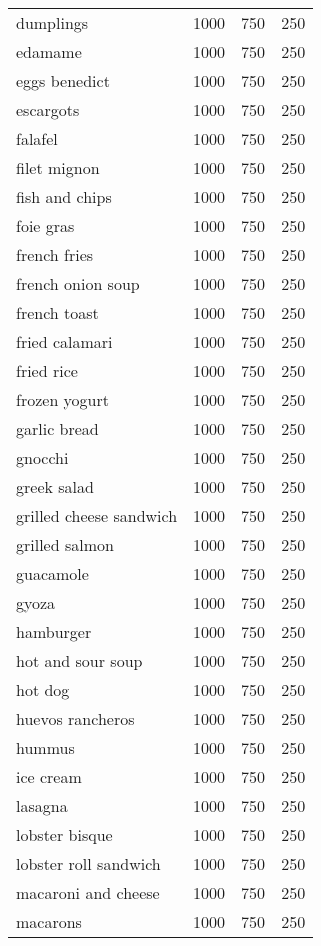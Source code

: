 \begin{center}
\begin{longtable}{|l|l|l|l|}
        dumplings & 1000 & 750 & 250 \\
        edamame & 1000 & 750 & 250 \\
        eggs benedict & 1000 & 750 & 250 \\
        escargots & 1000 & 750 & 250 \\
        falafel & 1000 & 750 & 250 \\
        filet mignon & 1000 & 750 & 250 \\
        fish and chips & 1000 & 750 & 250 \\
        foie gras & 1000 & 750 & 250 \\
        french fries & 1000 & 750 & 250 \\
        french onion soup & 1000 & 750 & 250 \\
        french toast & 1000 & 750 & 250 \\
        fried calamari & 1000 & 750 & 250 \\
        fried rice & 1000 & 750 & 250 \\
        frozen yogurt & 1000 & 750 & 250 \\
        garlic bread & 1000 & 750 & 250 \\
        gnocchi & 1000 & 750 & 250 \\
        greek salad & 1000 & 750 & 250 \\
        grilled cheese sandwich & 1000 & 750 & 250 \\
        grilled salmon & 1000 & 750 & 250 \\
        guacamole & 1000 & 750 & 250 \\
        gyoza & 1000 & 750 & 250 \\
        hamburger & 1000 & 750 & 250 \\
        hot and sour soup & 1000 & 750 & 250 \\
        hot dog & 1000 & 750 & 250 \\
        huevos rancheros & 1000 & 750 & 250 \\
        hummus & 1000 & 750 & 250 \\
        ice cream & 1000 & 750 & 250 \\
        lasagna & 1000 & 750 & 250 \\
        lobster bisque & 1000 & 750 & 250 \\
        lobster roll sandwich & 1000 & 750 & 250 \\
        macaroni and cheese & 1000 & 750 & 250 \\
        macarons & 1000 & 750 & 250 \\

\end{longtable}
\end{center}
